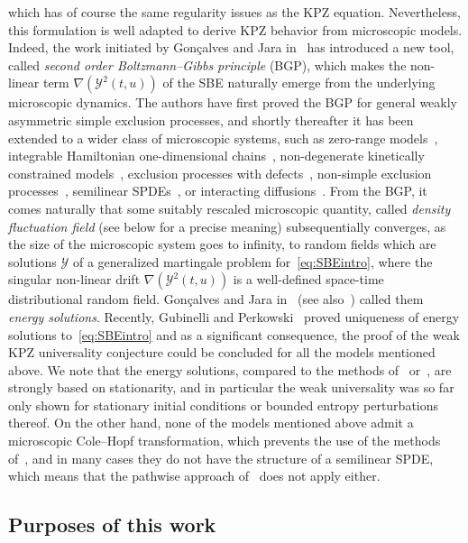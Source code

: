 \documentclass[10pt]{amsart}
\theoremstyle{definition}\newtheorem{defi}[theo]{Definition}\newtheorem{rema}[theo]{Remark}\newtheorem{exam}[theo]{Example}\newtheorem{exem}[theo]{Example}\newtheorem{nota}[theo]{Notation}
\newcommand{\mc}[1]{{\mathcal #1}}
\renewcommand{\mc}[1]{{\mathcal #1}}
\begin{document}
which has of course the same regularity issues as the KPZ equation. Nevertheless, this formulation is well adapted to derive KPZ behavior from microscopic models. Indeed, the work initiated by Gon\c{c}alves and Jara in~\cite{gj2014} has introduced a new tool, called \emph {second order Boltzmann--Gibbs principle} (BGP), which makes the non-linear term $\nabla (\mc Y^2(t,u))$ of the SBE naturally emerge from the underlying microscopic dynamics. The authors have first proved the BGP for general weakly asymmetric simple exclusion processes, and shortly thereafter it has been extended to a wider class of microscopic systems, such as zero-range models~\cite{GJS}, integrable Hamiltonian one-dimensional chains~\cite{GJSi}, non-degenerate kinetically constrained models~\cite{blondel2016}, exclusion processes with defects~\cite{fgsimon2015}, non-simple exclusion processes~\cite{GJLR}, semilinear SPDEs~\cite{Gubinelli2016Hairer}, or interacting diffusions~\cite{Diehl2017}. From the BGP, it comes naturally that some suitably rescaled microscopic quantity, called \emph{density fluctuation field} (see below for a precise meaning) subsequentially converges, as the size of the microscopic system goes to infinity, to random fields which are solutions $\mc Y$ of a generalized martingale problem for~\eqref{eq:SBEintro}, where the singular non-linear drift $\nabla (\mc Y^2(t,u))$ is a well-defined space-time distributional random field. Gon\c{c}alves and Jara in~\cite{gj2014} (see also~\cite{Gubinelli2013}) called them \emph{energy solutions}. Recently, Gubinelli and Perkowski~\cite{Gubinelli2015Energy} proved uniqueness of energy solutions to~\eqref{eq:SBEintro} and as a significant consequence, the proof of the weak KPZ universality conjecture could be concluded for all the models mentioned above. We note that the energy solutions, compared to the methods of~\cite{BerG} or~\cite{Hairer2014,Gubinelli2015Paracontrolled}, are strongly based on stationarity, and in particular the weak universality was so far only shown for stationary initial conditions or bounded entropy perturbations thereof. On the other hand, none of the models mentioned above admit a microscopic Cole--Hopf transformation, which prevents the use of the methods of~\cite{BerG}, and in many cases they do not have the structure of a semilinear SPDE, which means that the pathwise approach of~\cite{Hairer2014,Gubinelli2015Paracontrolled} does not apply either.

\subsection{Purposes of this work}
\end{document}
